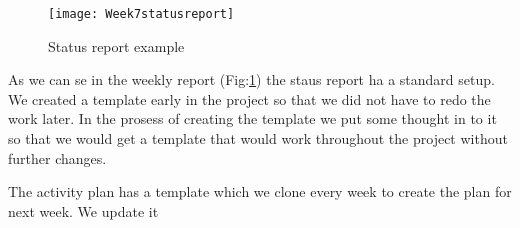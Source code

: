     \begin{figure}[h]
        \centering
        \texttt{[image: Week7statusreport]}
        \caption{Status report example}
        \label{fig:Week7statusreport}
    \end{figure}
    
    As we can se in the weekly report (Fig:\ref{fig:Week7statusreport}) the staus report ha a standard setup. We created a template early in the project so that we did not have to redo the work later. In the prosess of creating the template we put some thought in to it so that we would get a template that would work throughout the project without further changes. 
    

    
    The activity plan has a template which we clone every week to create the plan for next week. We update it  






